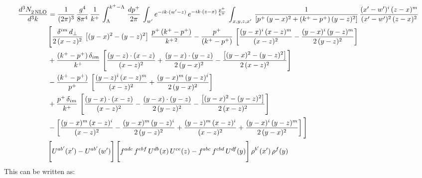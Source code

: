 \documentclass[9pt]{article}
\numberwithin{equation}{section}
\begin{document}
\begin{align}
    \frac{d^{3}N_{2\,\rm NLO}^{\rm}}{d^{3}k}  & =  \frac{1}{(2\pi)^{3}}\,\frac{g^{4}}{8\pi^{4}}\,\frac{1}{k^{+}}\,\int_{\Lambda}^{k^{+}-\Lambda}\, \frac{dp^{+}}{2\pi} \,\int_{ w^\prime} e^{-ik\cdot(w'-z)}\,e^{-ik\cdot (z-x)\,\frac{p^{+}}{k^{+}}}\, \int_{x,y,z,x'}\,\frac{1}{\left[p^{+}\,(y-x)^{2}+(k^{+}-p^{+})\,(y-z)^{2}\right]}\, \frac{(x'-w')^{i}\,(z-x)^{m}}{(x'-w')^{2}\,(z-x)^{2}} \notag \\ & \Bigg[\frac{\delta^{im}\,d_{\perp}}{2\,(x-z)^{2}}\,\left[(y-x)^{2}-(y-z)^{2}\right]\,\frac{p^{+}\,(k^{+}-p^{+})}{k^{+\,2}}-\frac{p^{+}}{(k^{+}-p^{+})}\,\left[\frac{(y-x)^{i}\,(x-z)^{m}}{(x-z)^{2}}-\frac{(y-x)^{i}\,(y-z)^{m}}{2\,(y-z)^{2}}\right]\notag \\ & +\frac{(k^{+}-p^{+})\,\delta_{im}}{k^{+}}\,\left[\frac{(y-z)\cdot (x-z)}{(x-z)^{2}}+\frac{(y-x)\cdot (y-z)}{2\,(y-x)^{2}}-\frac{\left[(y-x)^{2}-(y-z)^{2}\right]}{2\,(x-z)^{2}}\right]\notag \\ & -\frac{(k^{+}-p^{+})}{p^{+}}\,\left[\frac{(y-z)^{i}\,(x-z)^{m}}{(x-z)^{2}}+\frac{(y-x)^{m}\,(y-z)^{i}}{2\,(y-x)^{2}}\right]\notag \\ & +\frac{p^{+}\,\delta_{im}}{k^{+}}\,\left[\frac{(y-x)\cdot (x-z)}{(x-z)^{2}}-\frac{(y-x)\cdot (y-z)}{2\,(y-z)^{2}}-\frac{\left[(y-x)^{2}-(y-z)^{2}\right]}{2\,(x-z)^{2}}\right]\notag \\ &-\left[\frac{(y-x)^{m}\,(x-z)^{i}}{(x-z)^{2}}-\frac{(y-x)^{m}\,(y-z)^{i}}{2\,(y-z)^{2}}+\frac{(y-z)^{m}\,(x-z)^{i}}{(x-z)^{2}}+\frac{(y-x)^{i}\,(y-z)^{m}}{2\,(y-x)^{2}}\right]\Bigg] \notag \\ & \Bigg[U^{ab'}(x')-U^{ab'}(w')\Bigg]\,\Bigg[f^{adc}\,f^{ebf}\,U^{db}(x)\,U^{ce}(z)-f^{abc}\,f^{cbd}\,U^{df}(y)\Bigg]\,\rho^{b'}(x')\,\rho^{f}(y)
\end{align}
This can be written as: 
\end{document}
